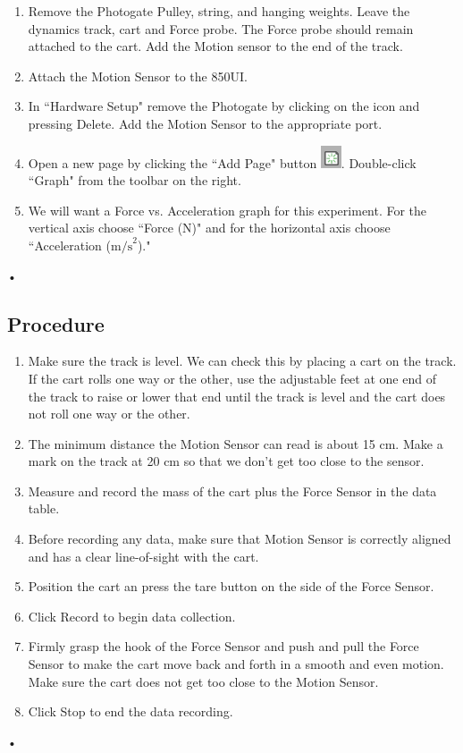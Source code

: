 \documentclass[main.tex]{subfiles}
\begin{document}
\begin{enumerate}
\item
Remove the Photogate Pulley, string, and hanging weights. Leave the dynamics track, cart and Force probe. The Force probe should remain attached to the cart. Add the Motion sensor to the end of the track.
\item
Attach the Motion Sensor to the 850UI.
\item
In ``Hardware Setup" remove the Photogate by clicking on the icon and pressing Delete. Add the Motion Sensor to the appropriate port.
\item
Open a new page by clicking the ``Add Page" button \includegraphics{Add_Page}. Double-click ``Graph" from the toolbar on the right.
\item
We will want a Force vs. Acceleration graph for this experiment. For the vertical axis choose ``Force (N)" and for the horizontal axis choose ``Acceleration ($\text{m/s}^2$)."
\end{enumerate}•

\subsection*{Procedure}
\begin{enumerate}
\item
Make sure the track is level. We can check this by  placing a cart on the track. If the cart rolls one way or the other, use the adjustable feet at one end of the track to raise or lower that end until the track is level and the cart does not roll one way or the other.
\item
The minimum distance the Motion Sensor can read is about 15 cm. Make a mark on the track at 20 cm so that we don't get too close to the sensor.
\item
Measure and record the mass of the cart plus the Force Sensor in the data table.
\item
Before recording any data, make sure that Motion Sensor is correctly aligned and has a clear line-of-sight with the cart.
\item
Position the cart an press the tare button on the side of the Force Sensor.
\item
Click Record to begin data collection.
\item
Firmly grasp the hook of the Force Sensor and push and pull the Force Sensor to make the cart move back and forth in a smooth and even motion. Make sure the cart does not get too close to the Motion Sensor.
\item
Click Stop to end the data recording.
\end{enumerate}•
\end{document}
